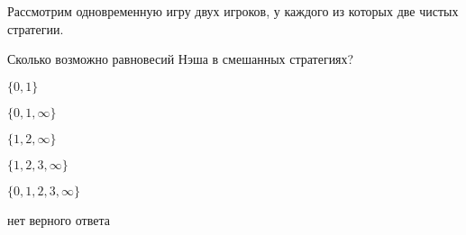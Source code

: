 
\begin{question}
Рассмотрим одновременную игру двух игроков, у каждого из которых две чистых стратегии.

Сколько возможно равновесий Нэша в смешанных стратегиях?
\begin{answerlist}
  \item \(\{0, 1\}\)
  \item \(\{0, 1, \infty \}\)
  \item \(\{1, 2, \infty \}\)
  \item \(\{1, 2, 3, \infty \}\)
  \item \(\{0, 1, 2, 3, \infty \}\)
  \item нет верного ответа
\end{answerlist}
\end{question}


